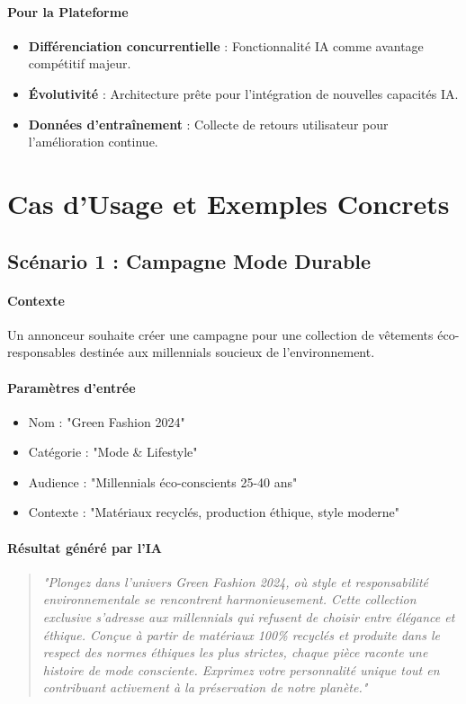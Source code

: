 \paragraph{Pour la Plateforme}
\begin{itemize}[label=\textbullet]
    \item \textbf{Différenciation concurrentielle} : Fonctionnalité IA comme avantage compétitif majeur.
    \item \textbf{Évolutivité} : Architecture prête pour l'intégration de nouvelles capacités IA.
    \item \textbf{Données d'entraînement} : Collecte de retours utilisateur pour l'amélioration continue.
\end{itemize}

\section{Cas d'Usage et Exemples Concrets}

\subsection{Scénario 1 : Campagne Mode Durable}

\paragraph{Contexte}
Un annonceur souhaite créer une campagne pour une collection de vêtements éco-responsables destinée aux millennials soucieux de l'environnement.

\paragraph{Paramètres d'entrée}
\begin{itemize}[label=\textbullet]
    \item Nom : "Green Fashion 2024"
    \item Catégorie : "Mode & Lifestyle"
    \item Audience : "Millennials éco-conscients 25-40 ans"
    \item Contexte : "Matériaux recyclés, production éthique, style moderne"
\end{itemize}

\paragraph{Résultat généré par l'IA}
\begin{quote}
\textit{"Plongez dans l'univers Green Fashion 2024, où style et responsabilité environnementale se rencontrent harmonieusement. Cette collection exclusive s'adresse aux millennials qui refusent de choisir entre élégance et éthique. Conçue à partir de matériaux 100\% recyclés et produite dans le respect des normes éthiques les plus strictes, chaque pièce raconte une histoire de mode consciente. Exprimez votre personnalité unique tout en contribuant activement à la préservation de notre planète."}
\end{quote}

